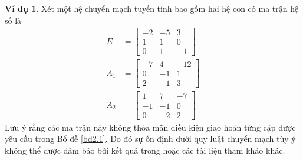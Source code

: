 \documentclass[12pt,a4paper]{report}
\theoremstyle{definition}
\newtheorem{vd}{Ví dụ}
\theoremstyle{definition}
\numberwithin{dl}{chapter}
\numberwithin{vd}{chapter}
\numberwithin{corollary}{chapter}
\numberwithin{lemma}{chapter}
\numberwithin{md}{chapter}
\numberwithin{dn}{chapter}
\numberwithin{cy}{chapter}
\numberwithin{nx}{chapter}
\begin{document}
\begin{vd} Xét một hệ chuyển mạch tuyến tính bao gồm hai hệ con có ma trận hệ số là
\begin{equation}\label{2.62}
\begin{aligned}
E &=\left[\begin{array}{rrr}
-2 & -5 & 3 \\
1 & 1 & 0 \\
0 & 1 & -1
\end{array}\right] \\
A_{1} &=\left[\begin{array}{rrr}
-7 & 4 & -12 \\
0 & -1 & 1 \\
2 & -1 & 3
\end{array}\right]  \\
A_{2} &=\left[\begin{array}{rrr}
1 & 7 & -7 \\
-1 & -1 & 0 \\
0 & -2 & 2
\end{array}\right]
\end{aligned}
\end{equation}
Lưu ý rằng các ma trận này không thỏa mãn điều kiện giao hoán từng cặp được yêu cầu trong Bổ đề \ref{bd2.1}. Do đó sự ổn định dưới quy luật chuyển mạch tùy ý không thể được đảm bảo bởi kết quả trong \cite{Zhai09a} hoặc các tài liệu tham khảo khác.\\


\end{vd}
\end{document}
